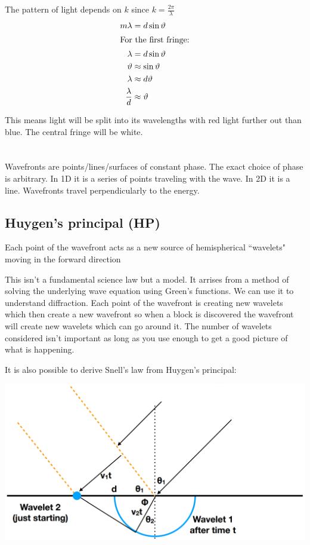 \documentclass{article}
\begin{document}
The pattern of light depends on \(k\) since \(k=\frac{2\pi}{\lambda}\)
\begin{align*}
m\lambda&=d\sin\vartheta\\
\intertext{For the first fringe:}
\lambda&=d\sin\vartheta\\
\vartheta&\approx\sin\vartheta\\
\lambda&\approx d\vartheta\\
\frac{\lambda}{d}&\approx\vartheta
\end{align*}

This means light will be split into its wavelengths with red light further out than blue. The central fringe will be white.

\section{}
Wavefronts are points/lines/surfaces of constant phase. The exact choice of phase is arbitrary. In 1D it is a series of points traveling with the wave. In 2D it is a line. Wavefronts travel perpendicularly to the energy.

\subsection*{Huygen's principal (HP)}

\begin{displayquote}
Each point of the wavefront acts as a new source of hemispherical ``wavelets" moving in the forward direction
\end{displayquote}

This isn't a fundamental science law but a model. It arrises from a method of solving the underlying wave equation using Green's functions. We can use it to understand diffraction. Each point of the wavefront is creating new wavelets which then create a new wavefront so when a block is discovered the wavefront will create new wavelets which can go around it. The number of wavelets considered isn't important as long as you use enough to get a good picture of what is happening.

It is also possible to derive Snell's law from Huygen's principal:

\begin{center}
\includegraphics[scale=0.3]{HuygensSnellsLaw}
\end{center}
\end{document}

